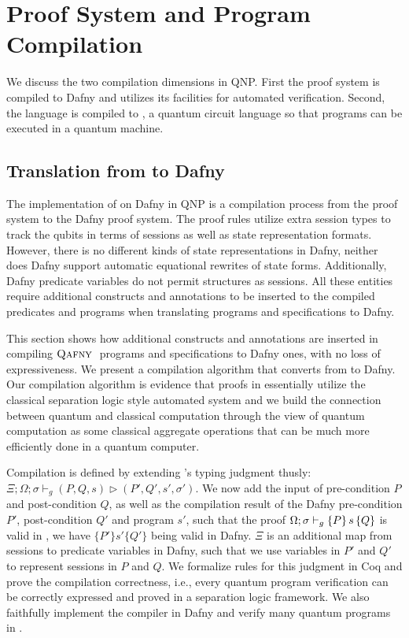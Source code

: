 \section{\qafny Proof System and Program Compilation}

We discuss the two compilation dimensions in QNP. First the \qafny proof system is compiled to Dafny and utilizes its facilities for automated verification. Second, the \qafny language is compiled to \sqir, a quantum circuit language so that \qafny programs can be executed in a quantum machine.

\subsection{Translation from \qafny to Dafny}\label{sec:dafny-compilation}

The implementation of \qafny on Dafny in QNP is a compilation process from the \qafny proof system to the Dafny proof system. The \qafny proof rules utilize extra session types to track the qubits in terms of sessions as well as state representation formats. However, there is no different kinds of state representations in Dafny, neither does Dafny support automatic equational rewrites of state forms. Additionally, Dafny predicate variables do not permit structures as sessions. All these entities require additional constructs and annotations to be inserted to the compiled predicates and programs when translating \qafny programs and specifications to Dafny.

This section shows how additional constructs and annotations are inserted in compiling $\textsc{Qafny}\;$ programs and specifications to Dafny ones, with no loss of expressiveness.
We present a compilation algorithm that converts from
\qafny to Dafny. Our compilation algorithm is evidence that proofs in \qafny essentially utilize the classical separation logic style automated system and we build the connection between quantum and classical computation through the view of quantum computation as some classical aggregate operations that can be much more efficiently done in a quantum computer.

Compilation is defined by extending \qafny's
typing judgment thusly: $\Xi;\Omega;\sigma\vdash_g (P,Q,s) \triangleright (P',Q',s',\sigma')$.
We now add the input of pre-condition $P$ and post-condition $Q$, as well as the compilation result of the Dafny pre-condition $P'$, post-condition $Q'$ and program $s'$, such that the proof $\Omega;\sigma\vdash_{g}\{P\}\, s \,\{Q\}$ is valid in \qafny, we have $\{P'\} s' \{Q'\}$ being valid in Dafny. $\Xi$ is an additional map from sessions to predicate variables in Dafny, such that we use variables in $P'$ and $Q'$ to represent sessions in $P$ and $Q$. We formalize rules for this judgment in Coq and prove the compilation correctness, i.e., every \qafny quantum program verification can be correctly expressed and proved in a separation logic framework. We also faithfully implement the compiler in Dafny and verify many quantum programs in .


